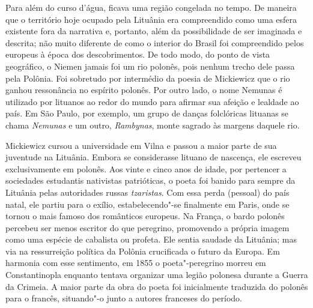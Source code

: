 Para além do curso d'água, ficava uma região congelada no tempo. De
maneira que o território hoje ocupado pela Lituânia era compreendido
como uma esfera existente fora da narrativa e, portanto, além da
possibilidade de ser imaginada e descrita; não muito diferente de como o
interior do Brasil foi compreendido pelos europeus à época dos
descobrimentos. De todo modo, do ponto de vista geográfico, o Niemen
jamais foi um rio polonês, pois nenhum trecho dele passa pela Polônia.
Foi sobretudo por intermédio da poesia de Mickiewicz que o rio ganhou
ressonância no espírito polonês. Por outro lado, o nome Nemunas é
utilizado por lituanos ao redor do mundo para afirmar sua afeição e
lealdade ao país. Em São Paulo, por exemplo, um grupo de danças
folclóricas lituanas se chama \textit{Nemunas} e um outro,
\textit{Rambynas}, monte sagrado às margens daquele rio.

Mickiewicz cursou a universidade em Vilna e passou a maior parte de sua
juventude na Lituânia. Embora se considerasse lituano de nascença, ele
escreveu exclusivamente em polonês. Aos vinte e cinco anos de idade, por
pertencer a sociedades estudantis nativistas patrióticas, o poeta foi
banido para sempre da Lituânia pelas autoridades russas \textit{tzaristas}. Com
essa perda (pessoal) do país natal, ele partiu para o exílio,
estabelecendo"-se finalmente em Paris, onde se tornou o mais famoso dos
românticos europeus. Na França, o bardo polonês percebeu ser menos
escritor do que peregrino, promovendo a própria imagem como uma espécie
de cabalista ou profeta. Ele sentia saudade da Lituânia; mas via na
ressurreição política da Polônia crucificada o futuro da Europa. Em
harmonia com esse sentimento, em 1855 o poeta"-peregrino morreu em
Constantinopla enquanto tentava organizar uma legião polonesa durante a
Guerra da Crimeia. A maior parte da obra do poeta foi inicialmente
traduzida do polonês para o francês, situando"-o junto a autores
franceses do período.

